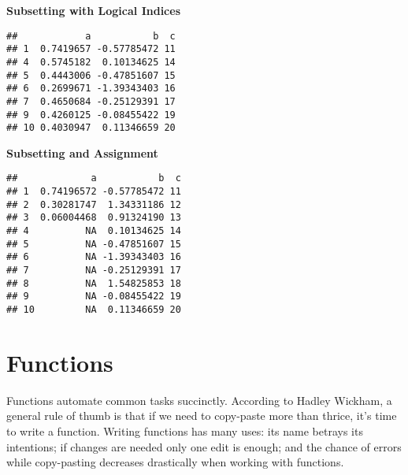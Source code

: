 \documentclass[11pt,]{article}
\newenvironment{Shaded}{\begin{snugshade}}{\end{snugshade}}
\newcommand{\DecValTok}[1]{\textcolor[rgb]{0.00,0.00,0.81}{#1}}
\newcommand{\FloatTok}[1]{\textcolor[rgb]{0.00,0.00,0.81}{#1}}
\newcommand{\StringTok}[1]{\textcolor[rgb]{0.31,0.60,0.02}{#1}}
\newcommand{\CommentTok}[1]{\textcolor[rgb]{0.56,0.35,0.01}{\textit{#1}}}
\newcommand{\OtherTok}[1]{\textcolor[rgb]{0.56,0.35,0.01}{#1}}
\newcommand{\OperatorTok}[1]{\textcolor[rgb]{0.81,0.36,0.00}{\textbf{#1}}}
\newcommand{\NormalTok}[1]{#1}
\begin{document}
\textbf{Subsetting with Logical Indices}

\begin{Shaded}
\end{Shaded}

\begin{verbatim}
##            a           b  c
## 1  0.7419657 -0.57785472 11
## 4  0.5745182  0.10134625 14
## 5  0.4443006 -0.47851607 15
## 6  0.2699671 -1.39343403 16
## 7  0.4650684 -0.25129391 17
## 9  0.4260125 -0.08455422 19
## 10 0.4030947  0.11346659 20
\end{verbatim}

\textbf{Subsetting and Assignment}

\begin{Shaded}
\end{Shaded}

\begin{verbatim}
##             a           b  c
## 1  0.74196572 -0.57785472 11
## 2  0.30281747  1.34331186 12
## 3  0.06004468  0.91324190 13
## 4          NA  0.10134625 14
## 5          NA -0.47851607 15
## 6          NA -1.39343403 16
## 7          NA -0.25129391 17
## 8          NA  1.54825853 18
## 9          NA -0.08455422 19
## 10         NA  0.11346659 20
\end{verbatim}

\section{Functions}\label{functions}

Functions automate common tasks succinctly. According to Hadley Wickham,
a general rule of thumb is that if we need to copy-paste more than
thrice, it's time to write a function. Writing functions has many uses:
its name betrays its intentions; if changes are needed only one edit is
enough; and the chance of errors while copy-pasting decreases
drastically when working with functions.
\end{document}
